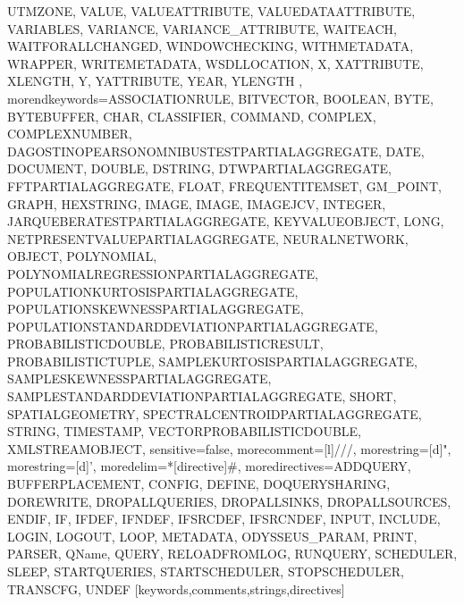 {{UTMZONE, VALUE, VALUEATTRIBUTE, VALUEDATAATTRIBUTE, VARIABLES, VARIANCE, VARIANCE_ATTRIBUTE, WAITEACH, WAITFORALLCHANGED, WINDOWCHECKING, WITHMETADATA, WRAPPER, WRITEMETADATA, WSDLLOCATION, X, XATTRIBUTE, XLENGTH, Y, YATTRIBUTE, YEAR, YLENGTH%
      },%
   morendkeywords={ASSOCIATIONRULE, BITVECTOR, BOOLEAN, BYTE, BYTEBUFFER, CHAR, CLASSIFIER, COMMAND, COMPLEX, COMPLEXNUMBER, DAGOSTINOPEARSONOMNIBUSTESTPARTIALAGGREGATE, DATE, DOCUMENT, DOUBLE, DSTRING, DTWPARTIALAGGREGATE, FFTPARTIALAGGREGATE, FLOAT, FREQUENTITEMSET, GM_POINT, GRAPH, HEXSTRING, IMAGE, IMAGE, IMAGEJCV, INTEGER, JARQUEBERATESTPARTIALAGGREGATE, KEYVALUEOBJECT, LONG, NETPRESENTVALUEPARTIALAGGREGATE, NEURALNETWORK, OBJECT, POLYNOMIAL, POLYNOMIALREGRESSIONPARTIALAGGREGATE, POPULATIONKURTOSISPARTIALAGGREGATE, POPULATIONSKEWNESSPARTIALAGGREGATE, POPULATIONSTANDARDDEVIATIONPARTIALAGGREGATE, PROBABILISTICDOUBLE, PROBABILISTICRESULT, PROBABILISTICTUPLE, SAMPLEKURTOSISPARTIALAGGREGATE, SAMPLESKEWNESSPARTIALAGGREGATE, SAMPLESTANDARDDEVIATIONPARTIALAGGREGATE, SHORT, SPATIALGEOMETRY, SPECTRALCENTROIDPARTIALAGGREGATE, STRING, TIMESTAMP, VECTORPROBABILISTICDOUBLE, XMLSTREAMOBJECT},%
   sensitive=false,
   morecomment=[l]///,%
   morestring=[d]",%
   morestring=[d]',%
   moredelim=*[directive]\#,%
   moredirectives={ADDQUERY, BUFFERPLACEMENT, CONFIG, DEFINE, DOQUERYSHARING, DOREWRITE, DROPALLQUERIES, DROPALLSINKS, DROPALLSOURCES, ENDIF, IF, IFDEF, IFNDEF, IFSRCDEF, IFSRCNDEF, INPUT, INCLUDE, LOGIN, LOGOUT, LOOP, METADATA, ODYSSEUS_PARAM, PRINT, PARSER, QName, QUERY, RELOADFROMLOG, RUNQUERY, SCHEDULER, SLEEP, STARTQUERIES, STARTSCHEDULER, STOPSCHEDULER, TRANSCFG, UNDEF}%
}[keywords,comments,strings,directives]

